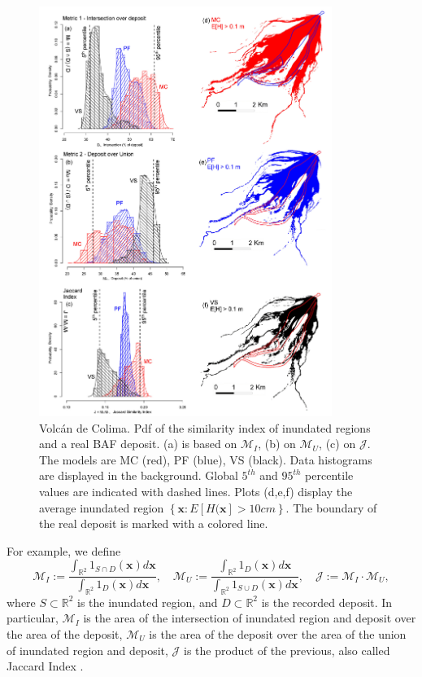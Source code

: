 \documentclass{article}
\begin{document}
\begin{figure}[H]
         \centering
        \includegraphics[width=0.85\textwidth]{figures/Colima/Histograms.jpg}
        \caption{Volc{\'a}n de Colima. Pdf of the similarity index of inundated regions and a real BAF deposit. (a) is based on $\mathcal M_I$, (b) on $\mathcal M_U$, (c) on $\mathcal J$. The models are MC (red), PF (blue), VS (black). Data histograms are displayed in the background. Global $5^{th}$ and $95^{th}$ percentile values are indicated with dashed lines. Plots (d,e,f) display the average inundated region $\left\{\textbf{x} : E[H(\textbf{x}]>10 cm\right\}$. The boundary of the real deposit is marked with a colored line.}\label{fig:Colima-Hist}
\end{figure}
For example, we define
$$\mathcal M_I:=\frac{\int_{\mathbb R^2} 1_{S \cap D}(\textbf{x}) d\textbf{x}}{\int_{\mathbb R^2} 1_D(\textbf{x})d\textbf{x}},\quad \mathcal M_U:=\frac{\int_{\mathbb R^2} 1_D(\textbf{x})d\textbf{x}}{\int_{\mathbb R^2} 1_{S \cup D}(\textbf{x}) d\textbf{x}}, \quad \mathcal J:=\mathcal M_I\cdot \mathcal M_U,$$
where $S\subset \mathbb R^2$ is the inundated region, and $D\subset \mathbb R^2$ is the recorded deposit. In particular, $\mathcal M_I$ is the area of the intersection of inundated region and deposit over the area of the deposit, $\mathcal M_U$ is the area of the deposit over the area of the union of inundated region and deposit, $\mathcal J$ is the product of the previous, also called Jaccard Index \citep{Jaccard1901}.
\end{document}
